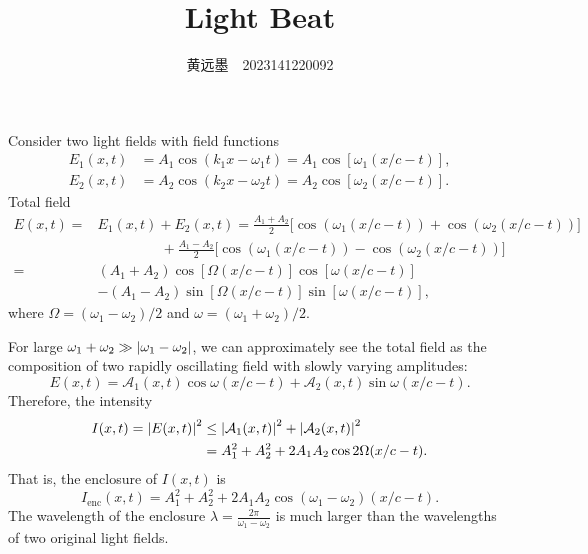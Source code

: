 \documentclass[12pt, twoside]{article}   	%
\title{Light Beat}
\author{黄远墨~~\textsf{2023141220092}}
\date{}							%
\theoremstyle{plain}
\theoremstyle{definition}
\begin{document}
	\maketitle
	
	Consider two light fields with field functions
	\begin{align}
		E_1(x, t) &= A_1 \cos\left( k_1 x - \omega_1 t \right) = A_1 \cos\left[ \omega_1 \left(
		x/c - t \right) \right], \\
		E_2(x, t) &= A_2 \cos\left( k_2 x - \omega_2 t \right) = A_2 \cos\left[ \omega_2 \left(
		x/c - t \right) \right].
	\end{align}
	Total field
	\begin{equation}
		\begin{aligned}
			E(x, t) =& E_1(x, t) + E_2(x, t) = \frac{A_1 + A_2}{2} \Big[ \cos\left( \omega_1
			(x/c - t) \right) + \cos\left( \omega_2 (x/c - t) \right)\Big]\\
					&\phantom{000000000}+ \frac{A_1 - A_2}{2} \Big[ \cos\left( \omega_1
					(x/c - t) \right)
					- \cos\left( \omega_2 (x/c - t) \right) \Big]\\
					=& (A_1 + A_2) \cos\left[ \Omega (x/c - t)
					\right] \cos\left[ \omega (x/c - t) \right]\\
					 &- (A_1 - A_2) \sin\left[ \Omega (x/c - t)
					 \right] \sin\left[ \omega (x/c - t) \right],
		\end{aligned}
	\end{equation}
	where $\Omega = (\omega_1 - \omega_2) / 2$ and $\omega = (\omega_1 + \omega_2) / 2$.

	For large $\omega_1 + \omega_2 \gg \abs{\omega_1 - \omega_2}$, we can approximately see the total
	field as the composition of two rapidly oscillating field with slowly varying amplitudes:
	\begin{equation}
		E(x, t) = \mathcal A_1(x, t) \cos\omega(x/c - t) + \mathcal A_2(x, t) \sin\omega(x/c - t).
	\end{equation}
	Therefore, the intensity
	\begin{equation}
		\begin{aligned}
			I(x, t) = \abs{E(x, t)}^2 &\leq \abs{\mathcal A_1(x, t)}^2 + \abs{\mathcal A_2(x, t)}^2\\
									  &= A_1^2 + A_2^2 + 2 A_1 A_2 \cos 2\Omega(x/c - t).
		\end{aligned}
	\end{equation}
	That is, the enclosure of $I(x, t)$ is
	\begin{equation}
		I_{\text{enc}}(x, t) = A_1^2 + A_2^2 + 2 A_1 A_2 \cos(\omega_1 - \omega_2) (x/c - t).
	\end{equation}
	The wavelength of the enclosure $\lambda = \frac{2 \pi}{\omega_1 - \omega_2}$ is much larger
	than the wavelengths of two original light fields.
	
\end{document}
